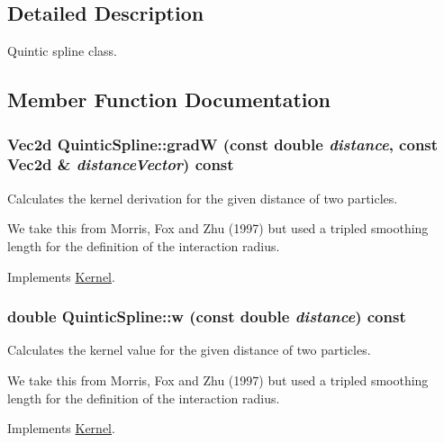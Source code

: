 \subsection{Detailed Description}
Quintic spline class. 

\subsection{Member Function Documentation}
\hypertarget{classQuinticSpline_00a31074e58e60a4721144e4935c56b2}{
\subsubsection[{gradW}]{\setlength{\rightskip}{0pt plus 5cm}Vec2d QuinticSpline::gradW (const double {\em distance}, \/  const Vec2d \& {\em distanceVector}) const}}
\label{classQuinticSpline_00a31074e58e60a4721144e4935c56b2}


Calculates the kernel derivation for the given distance of two particles. 

We take this from Morris, Fox and Zhu (1997) but used a tripled smoothing length for the definition of the interaction radius. 

Implements \hyperlink{classKernel_545e61b98db05db6dd02b88e2ad3da23}{Kernel}.\hypertarget{classQuinticSpline_021acaeb55230bf10cf3a2c634381088}{
\subsubsection[{w}]{\setlength{\rightskip}{0pt plus 5cm}double QuinticSpline::w (const double {\em distance}) const}}
\label{classQuinticSpline_021acaeb55230bf10cf3a2c634381088}


Calculates the kernel value for the given distance of two particles. 

We take this from Morris, Fox and Zhu (1997) but used a tripled smoothing length for the definition of the interaction radius. 

Implements \hyperlink{classKernel_6b4d26ba99457a4acbbbca1454dbdc8a}{Kernel}.

